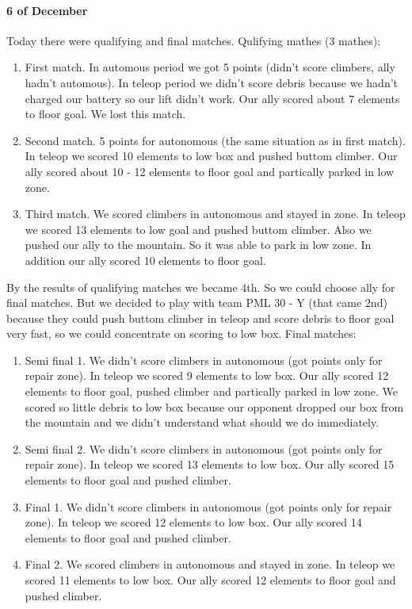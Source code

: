 \paragraph{6 of December} 
Today there were qualifying and final matches.\newline
Qulifying mathes (3 mathes):
\begin{enumerate}
	\item First match. In automous period we got 5 points (didn't score climbers, ally hadn't automous). In teleop period we didn't score debris because we hadn't charged our battery so our lift didn't work. Our ally scored about 7 elements to floor goal. We lost this match.
	\item Second match. 5 points for autonomous (the same situation as in first match). In teleop we scored 10 elements to low box and pushed buttom climber. Our ally scored about 10 - 12 elements to floor goal and partically parked in low zone.
	\item Third match. We scored climbers in autonomous and stayed in zone. In teleop we scored 13 elements to low goal and pushed buttom climber. Also we pushed our ally to the mountain. So it was able to park in low zone. In addition our ally scored 10 elements to floor goal.
\end{enumerate}
By the results of qualifying matches we became 4th. So we could choose ally for final matches. But we decided to play with team PML 30 - Y (that came 2nd) because they could push buttom climber in teleop and score debris to floor goal very fast, so we could concentrate on scoring to low box.\newline
Final matches:
\begin{enumerate}
	\item Semi final 1. We didn't score climbers in autonomous (got points only for repair zone). In teleop we scored 9 elements to low box. Our ally scored 12 elements to floor goal, pushed climber and partically parked in low zone. We scored so little debris to low box because our opponent dropped our box from the mountain and we didn't understand what should we do immediately.
	
	\item Semi final 2. We didn't score climbers in autonomous (got points only for repair zone). In teleop we scored 13 elements to low box. Our ally scored 15 elements to floor goal and pushed climber.
	
	\item Final 1. We didn't score climbers in autonomous (got points only for repair zone). In teleop we scored 12 elements to low box. Our ally scored 14 elements to floor goal and pushed climber.
	
	\item Final 2. We scored climbers in autonomous and stayed in zone. In teleop we scored 11 elements to low box. Our ally scored 12 elements to floor goal and pushed climber.
\end{enumerate} 
